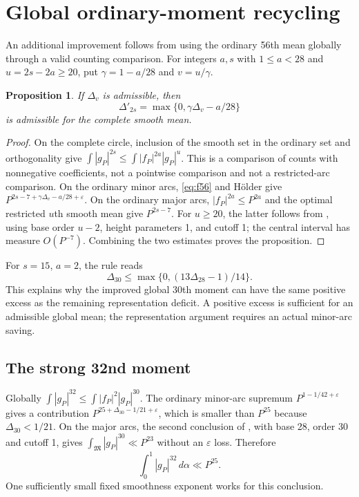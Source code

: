 \documentclass[11pt,letterpaper]{article}
\newtheorem{proposition}{Proposition}[section]
\theoremstyle{remark}
\newcommand{\M}{\mathfrak M}
\newcommand{\eps}{\varepsilon}
\newcommand{\dd}{\,d\alpha}
\begin{document}
\section{Global ordinary-moment recycling}\label{sec:recycle}

An additional improvement follows from using the ordinary 56th mean globally through
a valid counting comparison. For integers $a,s$ with $1\le a<28$ and
$u=2s-2a\ge20$, put $\gamma=1-a/28$ and $v=u/\gamma$.

\begin{proposition}
If $\Delta_v$ is admissible, then
\[
 \Delta'_{2s}=\max\{0,\gamma\Delta_v-a/28\}
\]
is admissible for the complete smooth mean.
\end{proposition}
\begin{proof}
On the complete circle, inclusion of the smooth set in the ordinary set and
orthogonality give
$\int|g_P|^{2s}\le\int|f_P|^{2a}|g_P|^u$.
This is a comparison of counts with nonnegative coefficients, not a pointwise
comparison and not a restricted-arc comparison. On the ordinary minor arcs,
\eqref{eq:f56} and H\"older give
$P^{2s-7+\gamma\Delta_v-a/28+\eps}$.
On the ordinary major arcs, $|f_P|^{2a}\le P^{2a}$ and the optimal restricted
$u$th smooth mean give $P^{2s-7}$.
For $u\ge20$, the latter follows from \cite[Theorem~1.3]{BW24}, using base order
$u-2$, height parameters 1, and cutoff 1; the central interval has measure $O(P^{-7})$.
Combining the two estimates proves the proposition.
\end{proof}

For $s=15$, $a=2$, the rule reads
\[
 \Delta_{30}\le\max\{0,(13\Delta_{28}-1)/14\}.
\]
This explains why the improved global 30th moment can have the same positive excess
as the remaining representation deficit. A positive excess is sufficient for an
admissible global mean; the representation argument requires an actual minor-arc
saving.

\subsection{The strong 32nd moment}

Globally $\int|g_P|^{32}\le\int|f_P|^2|g_P|^{30}$.
The ordinary minor-arc supremum $P^{1-1/42+\eps}$ gives a contribution
$P^{25+\Delta_{30}-1/21+\eps}$, which is smaller than $P^{25}$ because
$\Delta_{30}<1/21$. On the major arcs, the second conclusion of
\cite[Theorem~1.3]{BW24}, with base 28, order 30 and cutoff 1, gives
$\int_\M|g_P|^{30}\ll P^{23}$ without an $\eps$ loss. Therefore
\[
                    \boxed{\int_0^1|g_P|^{32}\dd\ll P^{25}.}
\]
One sufficiently small fixed smoothness exponent works for this conclusion.
\end{document}
